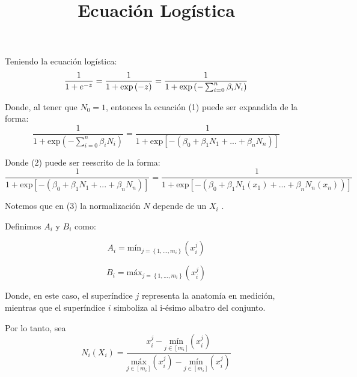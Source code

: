 \documentclass{article}
\begin{document}
\title{Ecuación Logística}
\maketitle
Teniendo la ecuación logística:
\begin{equation}
    \label{simple_equation}
    \frac{1}{1+e^{-z}} = \frac{1}{1+\mbox{\mbox{exp}}\left ( -z\right )} = \frac{1}{1+\mbox{\mbox{exp}}\left (-\sum_{i=0}^{n} \beta _{i}N_{i} \right )}
\end{equation}

Donde, al tener que $N_{0}=1$, entonces la ecuación (1) puede ser expandida de la forma:
\begin{equation}
    \label{simple_equation}
    \frac{1}{1+\mbox{exp}\left (-\sum_{i=0}^{n} \beta _{i}N_{i} \right )} = \frac{1}{1+\mbox{exp}\left [ -\left ( \beta _{0} + \beta _{1}N_{1}+...+\beta_{n}N_{n} \right ) \right ]}
\end{equation}

Donde (2) puede ser reescrito de la forma:
\begin{equation}
    \label{simple_equiation}    
    \frac{1}{1+\mbox{exp}\left [ -\left ( \beta _{0} + \beta _{1}N_{1}+...+\beta_{n}N_{n} \right ) \right ]} = \frac{1}{1+\mbox{exp}\left [ -\left ( \beta _{0} + \beta _{1}N_{1}(x_{1})+...+\beta_{n}N_{n} (x_{n})\right ) \right ]}
\end{equation}

Notemos que en (3) la normalización $N$ depende de un $X_{i}$ .

Definimos $A_{i}$ y $B_{i}$ como:

\begin{equation}
    \label{simple_equiation}
    A_{i}= \mbox{mín}_{j=\left \{ 1,...,m_{i} \right \}}\left ( x_{i}^{j} \right )
\end{equation}

\begin{equation}
    \label{simple_equiation}
    B_{i}= \mbox{máx}_{j=\left \{ 1,...,m_{i} \right \}}\left ( x_{i}^{j} \right )
\end{equation}

Donde, en este caso, el superíndice $j$ representa la anatomía en medición, mientras que el superíndice $i$ simboliza al i-ésimo albatro del conjunto.


Por lo tanto, sea 
\begin{equation} N_{i} \left ( X_{i} \right )= \frac{x_{i}^{j} - \underset{j\in [m_{i} ]}{\mbox{mín}}\left (  x_{i}^{j}\right )}{\underset{j\in [m_{i} ]}{\mbox{máx}}\left (  x_{i}^{j}\right )-\underset{j\in [m_{i} ]}{\mbox{mín}}\left (  x_{i}^{j}\right )}
\end{equation}
\end{document}
